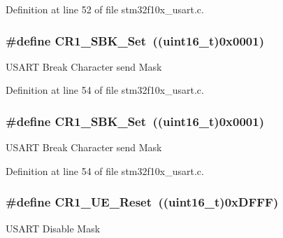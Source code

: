 Definition at line 52 of file stm32f10x\+\_\+usart.\+c.

\subsubsection[{\texorpdfstring{C\+R1\+\_\+\+S\+B\+K\+\_\+\+Set}{CR1_SBK_Set}}]{\setlength{\rightskip}{0pt plus 5cm}\#define C\+R1\+\_\+\+S\+B\+K\+\_\+\+Set~(({\bf uint16\+\_\+t})0x0001)}\hypertarget{group___u_s_a_r_t___private___defines_ga2813b7fa1263aecfeefa48f8a55938b9}{}\label{group___u_s_a_r_t___private___defines_ga2813b7fa1263aecfeefa48f8a55938b9}
U\+S\+A\+RT Break Character send Mask 

Definition at line 54 of file stm32f10x\+\_\+usart.\+c.

\subsubsection[{\texorpdfstring{C\+R1\+\_\+\+S\+B\+K\+\_\+\+Set}{CR1_SBK_Set}}]{\setlength{\rightskip}{0pt plus 5cm}\#define C\+R1\+\_\+\+S\+B\+K\+\_\+\+Set~(({\bf uint16\+\_\+t})0x0001)}\hypertarget{group___u_s_a_r_t___private___defines_ga2813b7fa1263aecfeefa48f8a55938b9}{}\label{group___u_s_a_r_t___private___defines_ga2813b7fa1263aecfeefa48f8a55938b9}
U\+S\+A\+RT Break Character send Mask 

Definition at line 54 of file stm32f10x\+\_\+usart.\+c.

\subsubsection[{\texorpdfstring{C\+R1\+\_\+\+U\+E\+\_\+\+Reset}{CR1_UE_Reset}}]{\setlength{\rightskip}{0pt plus 5cm}\#define C\+R1\+\_\+\+U\+E\+\_\+\+Reset~(({\bf uint16\+\_\+t})0x\+D\+F\+F\+F)}\hypertarget{group___u_s_a_r_t___private___defines_ga9c75a44192cb3dbbbf509cddfc47481c}{}\label{group___u_s_a_r_t___private___defines_ga9c75a44192cb3dbbbf509cddfc47481c}
U\+S\+A\+RT Disable Mask 

